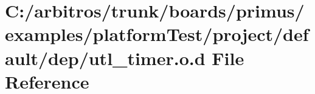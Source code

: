 \hypertarget{platform_test_2project_2default_2dep_2utl__timer_8o_8d}{\section{C\-:/arbitros/trunk/boards/primus/examples/platform\-Test/project/default/dep/utl\-\_\-timer.o.\-d File Reference}
\label{platform_test_2project_2default_2dep_2utl__timer_8o_8d}
}

